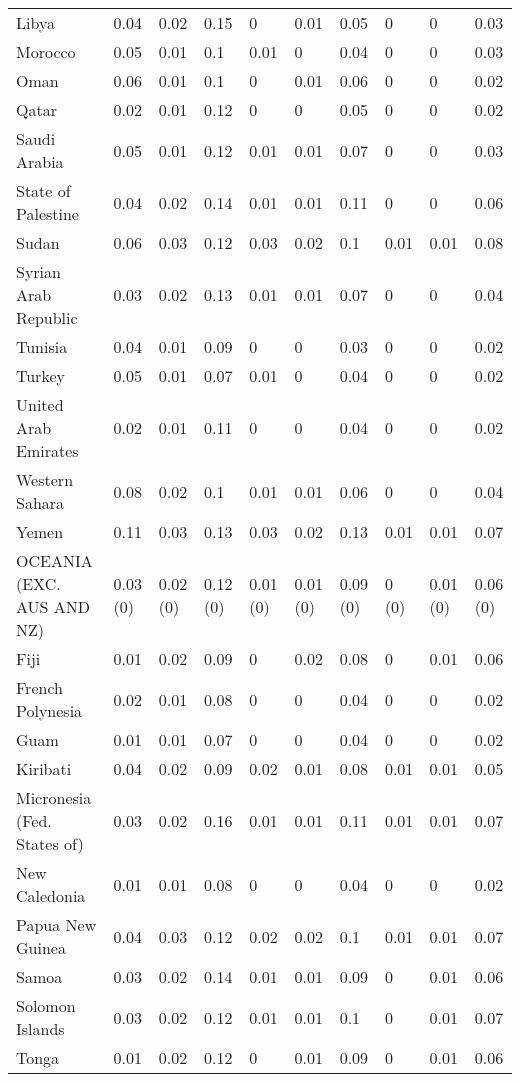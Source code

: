 \begin{longtable}[t]{llllllllll}
Libya & 0.04 & 0.02 & 0.15 & 0 & 0.01 & 0.05 & 0 & 0 & 0.03\\
Morocco & 0.05 & 0.01 & 0.1 & 0.01 & 0 & 0.04 & 0 & 0 & 0.03\\
Oman & 0.06 & 0.01 & 0.1 & 0 & 0.01 & 0.06 & 0 & 0 & 0.02\\
Qatar & 0.02 & 0.01 & 0.12 & 0 & 0 & 0.05 & 0 & 0 & 0.02\\
Saudi Arabia & 0.05 & 0.01 & 0.12 & 0.01 & 0.01 & 0.07 & 0 & 0 & 0.03\\
State of Palestine & 0.04 & 0.02 & 0.14 & 0.01 & 0.01 & 0.11 & 0 & 0 & 0.06\\
Sudan & 0.06 & 0.03 & 0.12 & 0.03 & 0.02 & 0.1 & 0.01 & 0.01 & 0.08\\
Syrian Arab Republic & 0.03 & 0.02 & 0.13 & 0.01 & 0.01 & 0.07 & 0 & 0 & 0.04\\
Tunisia & 0.04 & 0.01 & 0.09 & 0 & 0 & 0.03 & 0 & 0 & 0.02\\
Turkey & 0.05 & 0.01 & 0.07 & 0.01 & 0 & 0.04 & 0 & 0 & 0.02\\
United Arab Emirates & 0.02 & 0.01 & 0.11 & 0 & 0 & 0.04 & 0 & 0 & 0.02\\
Western Sahara & 0.08 & 0.02 & 0.1 & 0.01 & 0.01 & 0.06 & 0 & 0 & 0.04\\
Yemen & 0.11 & 0.03 & 0.13 & 0.03 & 0.02 & 0.13 & 0.01 & 0.01 & 0.07\\
OCEANIA (EXC. AUS AND NZ) & 0.03 (0) & 0.02 (0) & 0.12 (0) & 0.01 (0) & 0.01 (0) & 0.09 (0) & 0 (0) & 0.01 (0) & 0.06 (0)\\
Fiji & 0.01 & 0.02 & 0.09 & 0 & 0.02 & 0.08 & 0 & 0.01 & 0.06\\
French Polynesia & 0.02 & 0.01 & 0.08 & 0 & 0 & 0.04 & 0 & 0 & 0.02\\
Guam & 0.01 & 0.01 & 0.07 & 0 & 0 & 0.04 & 0 & 0 & 0.02\\
Kiribati & 0.04 & 0.02 & 0.09 & 0.02 & 0.01 & 0.08 & 0.01 & 0.01 & 0.05\\
Micronesia (Fed. States of) & 0.03 & 0.02 & 0.16 & 0.01 & 0.01 & 0.11 & 0.01 & 0.01 & 0.07\\
New Caledonia & 0.01 & 0.01 & 0.08 & 0 & 0 & 0.04 & 0 & 0 & 0.02\\
Papua New Guinea & 0.04 & 0.03 & 0.12 & 0.02 & 0.02 & 0.1 & 0.01 & 0.01 & 0.07\\
Samoa & 0.03 & 0.02 & 0.14 & 0.01 & 0.01 & 0.09 & 0 & 0.01 & 0.06\\
Solomon Islands & 0.03 & 0.02 & 0.12 & 0.01 & 0.01 & 0.1 & 0 & 0.01 & 0.07\\
Tonga & 0.01 & 0.02 & 0.12 & 0 & 0.01 & 0.09 & 0 & 0.01 & 0.06\\

\end{longtable}
